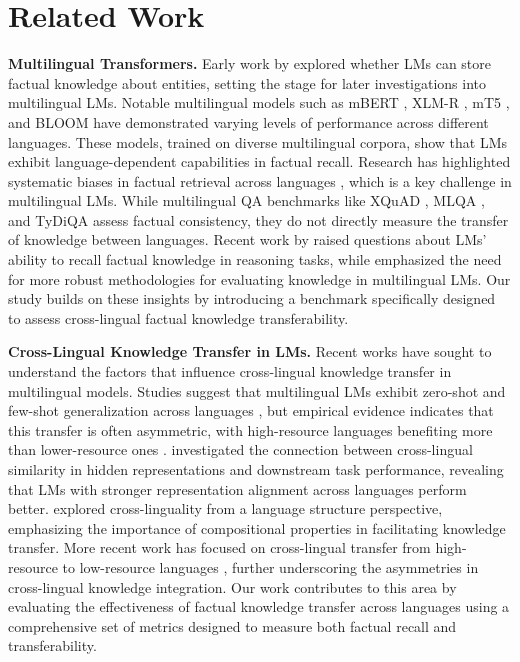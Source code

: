 \section{Related Work}
\textbf{Multilingual Transformers.} Early work by \cite{petroni-etal-2019-language} explored whether LMs can store factual knowledge about entities, setting the stage for later investigations into multilingual LMs. Notable multilingual models such as mBERT \cite{devlin-etal-2019-bert}, XLM-R \cite{conneau-etal-2020-unsupervised}, mT5 \cite{xue-etal-2021-mt5}, and BLOOM \cite{workshop2023bloom176bparameteropenaccessmultilingual} have demonstrated varying levels of performance across different languages. These models, trained on diverse multilingual corpora, show that LMs exhibit language-dependent capabilities in factual recall. Research has highlighted systematic biases in factual retrieval across languages \cite{artetxe-etal-2020-cross, liu-etal-2020-multilingual-denoising, kassner-etal-2021-multilingual}, which is a key challenge in multilingual LMs. While multilingual QA benchmarks like XQuAD \cite{artetxe-etal-2020-cross}, MLQA \cite{lewis-etal-2020-mlqa}, and TyDiQA \cite{clark-etal-2020-tydi} assess factual consistency, they do not directly measure the transfer of knowledge between languages. Recent work by \cite{wang-etal-2024-knowledge-mechanisms} raised questions about LMs' ability to recall factual knowledge in reasoning tasks, while \cite{fierro2025multilinguallanguagemodelsremember} emphasized the need for more robust methodologies for evaluating knowledge in multilingual LMs. Our study builds on these insights by introducing a benchmark specifically designed to assess cross-lingual factual knowledge transferability.

\textbf{Cross-Lingual Knowledge Transfer in LMs.} Recent works have sought to understand the factors that influence cross-lingual knowledge transfer in multilingual models. Studies suggest that multilingual LMs exhibit zero-shot and few-shot generalization across languages \cite{nooralahzadeh-etal-2020-zero, pfeiffer-etal-2020-mad}, but empirical evidence indicates that this transfer is often asymmetric, with high-resource languages benefiting more than lower-resource ones \cite{hu2020xtrememassivelymultilingualmultitask}. \cite{muller-etal-2021-first} investigated the connection between cross-lingual similarity in hidden representations and downstream task performance, revealing that LMs with stronger representation alignment across languages perform better. \cite{chai-etal-2022-cross} explored cross-linguality from a language structure perspective, emphasizing the importance of compositional properties in facilitating knowledge transfer. More recent work has focused on cross-lingual transfer from high-resource to low-resource languages \cite{zhao2024llama, zhao2024tracing}, further underscoring the asymmetries in cross-lingual knowledge integration. Our work contributes to this area by evaluating the effectiveness of factual knowledge transfer across languages using a comprehensive set of metrics designed to measure both factual recall and transferability.


